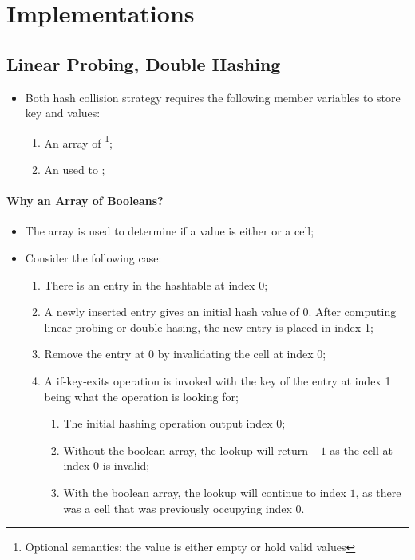 \section{Implementations}

\subsection{Linear Probing, Double Hashing}

  \begin{itemize}
    \item Both hash collision strategy requires the following member 
    variables to store key and values:
    \begin{enumerate}
      \item An array of 
      \footnote{Optional semantics: the value is either empty or hold 
      valid values};
      
      \item An  used to 
      ;
    \end{enumerate}
  \end{itemize}
  
  \paragraph{Why an Array of Booleans?}
  \begin{itemize}
    \item The array is used to determine if a value is 
    either  or  a cell;
    
    \item Consider the following case:
    \begin{enumerate}
      \item There is an entry in the hashtable at index 0;
      \item A newly inserted entry gives an initial hash value of 0.
      After computing linear probing or double hasing,
      the new entry is placed in index 1;
      \item Remove the entry at 0 by invalidating the cell at index 0;
      \item A if-key-exits operation is invoked with the key of the 
      entry at index 1 being what the operation is looking for;
      \begin{enumerate}
        \item The initial hashing operation output index 0;
        \item Without the boolean array, the lookup will return $ -1 $ as
        the cell at index 0 is invalid;
        \item With the boolean array, the lookup will continue to index $ 1 $,
        as there was a cell that was previously occupying index 0.
      \end{enumerate}
    \end{enumerate}
  \end{itemize}